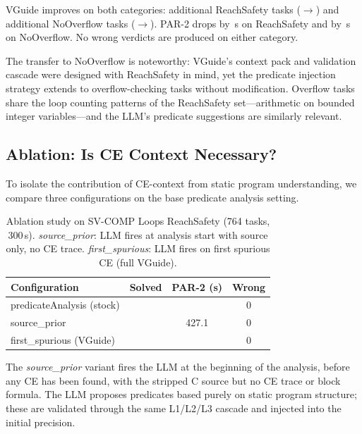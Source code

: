 VGuide improves on both categories: \CompReachDelta{} additional ReachSafety tasks
(\CompReachStock{}$\to$\CompReachVGuide{}) and \CompOvfDelta{} additional NoOverflow
tasks (\CompOvfStock{}$\to$\CompOvfVGuide{}). PAR-2 drops by \CompPARReachDelta{}\,s
on ReachSafety and by \CompPAROvfDelta{}\,s on NoOverflow. No wrong verdicts are
produced on either category.

The transfer to NoOverflow is noteworthy: VGuide's context pack and validation cascade
were designed with ReachSafety in mind, yet the predicate injection strategy extends to
overflow-checking tasks without modification. Overflow tasks share the loop counting
patterns of the ReachSafety set---arithmetic on bounded integer variables---and the
LLM's predicate suggestions are similarly relevant.

\subsection{Ablation: Is CE Context Necessary?}

To isolate the contribution of CE-context from static program understanding, we
compare three configurations on the base predicate analysis setting.

\begin{table}[t]
  \caption{Ablation study on SV-COMP Loops ReachSafety (764 tasks, 300\,s).
           \emph{source\_prior}: LLM fires at analysis start with source only, no
           CE trace. \emph{first\_spurious}: LLM fires on first spurious CE (full
           VGuide).}
  \label{tab:ablation}
  \centering
  \begin{tabular}{lccc}
    \toprule
    Configuration & Solved & PAR-2 (s) & Wrong \\
    \midrule
    predicateAnalysis (stock) & \LoopsStock{}           & \LoopsPARStock{}  & 0 \\
    source\_prior             & \AblationSourcePrior{}  & 427.1             & 0 \\
    first\_spurious (VGuide)  & \AblationFirstSpurious{}& \LoopsPARVGuide{} & 0 \\
    \bottomrule
  \end{tabular}
\end{table}

The \emph{source\_prior} variant fires the LLM at the beginning of the analysis, before
any CE has been found, with the stripped C source but no CE trace or block formula. The
LLM proposes predicates based purely on static program structure; these are validated
through the same L1/L2/L3 cascade and injected into the initial precision.

